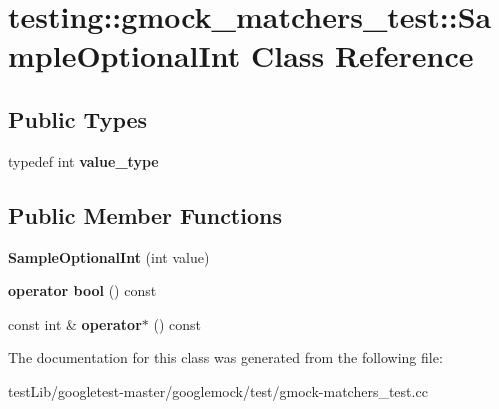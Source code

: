 \hypertarget{classtesting_1_1gmock__matchers__test_1_1SampleOptionalInt}{}\section{testing\+:\+:gmock\+\_\+matchers\+\_\+test\+:\+:Sample\+Optional\+Int Class Reference}
\label{classtesting_1_1gmock__matchers__test_1_1SampleOptionalInt}
\subsection*{Public Types}
\begin{DoxyCompactItemize}
\item 
\mbox{\label{classtesting_1_1gmock__matchers__test_1_1SampleOptionalInt_a9f1309a849993c56be680fc5468bf01a}} 
typedef int {\bfseries value\+\_\+type}
\end{DoxyCompactItemize}
\subsection*{Public Member Functions}
\begin{DoxyCompactItemize}
\item 
\mbox{\label{classtesting_1_1gmock__matchers__test_1_1SampleOptionalInt_aa0e9539a55f97693e24230e5857f7297}} 
{\bfseries Sample\+Optional\+Int} (int value)
\item 
\mbox{\label{classtesting_1_1gmock__matchers__test_1_1SampleOptionalInt_a1e638b606b7e48b395a76304153c8f17}} 
{\bfseries operator bool} () const
\item 
\mbox{\label{classtesting_1_1gmock__matchers__test_1_1SampleOptionalInt_a6b8fbe7ce0f98901e727c2e8e5415eba}} 
const int \& {\bfseries operator$\ast$} () const
\end{DoxyCompactItemize}


The documentation for this class was generated from the following file\+:\begin{DoxyCompactItemize}
\item 
test\+Lib/googletest-\/master/googlemock/test/gmock-\/matchers\+\_\+test.\+cc\end{DoxyCompactItemize}

